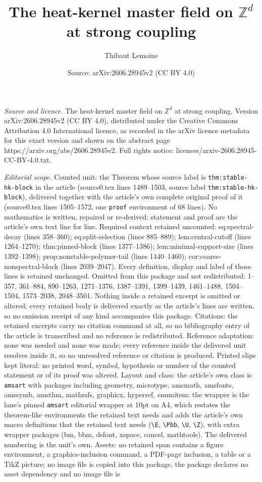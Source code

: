 \documentclass[10pt,a4paper]{amsart}
\title[The heat-kernel master field on $\mathbb{Z}^d$ at strong cou]{The heat-kernel master field on $\mathbb{Z}^d$ at strong coupling}
\author{Thibaut Lemoine}
\date{Source: arXiv:2606.28945v2 (CC BY 4.0)}
\begin{document}
\maketitle

\noindent\emph{Source and licence.} The heat-kernel master field on $\mathbb{Z}^d$ at strong coupling. Version arXiv:2606.28945v2 (CC BY 4.0), distributed under the Creative Commons Attribution 4.0 International licence, as recorded in the arXiv licence metadata for this exact version and shown on the abstract page https://arxiv.org/abs/2606.28945v2. Full rights notice: licenses/arxiv-2606.28945-CC-BY-4.0.txt.\par\smallskip

\noindent\textit{Editorial scope.} Counted unit: the Theorem whose source label is \texttt{thm:stable-hk-block} in the article (source0.tex lines 1489--1503, source label \texttt{thm:stable-hk-block}), delivered together with the article's own complete original proof of it (source0.tex lines 1505--1572, one \texttt{proof} environment of 68 lines). No mathematics is written, repaired or re-derived: statement and proof are the article's own text line for line. Required context retained uncounted: eq:spectral-decay (lines 358--360); eq:split-selection (lines 885--889); lem:central-cutoff (lines 1264--1270); thm:pinned-block (lines 1377--1386); lem:minimal-support-size (lines 1392--1398); prop:nonstable-polymer-tail (lines 1440--1460); cor:coarse-nonspectral-block (lines 2039--2047). Every definition, display and label of those lines is retained unchanged. Omitted from this package and not redistributed: 1--357, 361--884, 890--1263, 1271--1376, 1387--1391, 1399--1439, 1461--1488, 1504--1504, 1573--2038, 2048--3501. Nothing inside a retained excerpt is omitted or altered: every retained body is delivered exactly as the article's lines are written, so no omission receipt of any kind accompanies this package. Citations: the retained excerpts carry no citation command at all, so no bibliography entry of the article is transcribed and no reference is redistributed. Reference adaptation: none was needed and none was made; every reference inside the delivered unit resolves inside it, so no unresolved reference or citation is produced. Printed slips kept literal: no printed word, symbol, hypothesis or number of the counted statement or of its proof was altered. Layout and class: the article's own class is \texttt{amsart} with packages including geometry, microtype, amsmath, amsfonts, amssymb, amsthm, mathrsfs, graphicx, hyperref, enumitem; the wrapper is the lane's pinned \texttt{amsart} editorial wrapper at 10pt on A4, which restates the theorem-like environments the retained text needs and adds the article's own macro definitions that the retained text needs (\texttt{\textbackslash E}, \texttt{\textbackslash Pbb}, \texttt{\textbackslash U}, \texttt{\textbackslash Z}), with extra wrapper packages (bm, bbm, dsfont, xspace, cancel, mathtools). The delivered numbering is the unit's own. Assets: no retained span contains a figure environment, a graphics-inclusion command, a PDF-page inclusion, a table or a TikZ picture; no image file is copied into this package, the package declares no asset dependency and no image file is 
\end{document}
